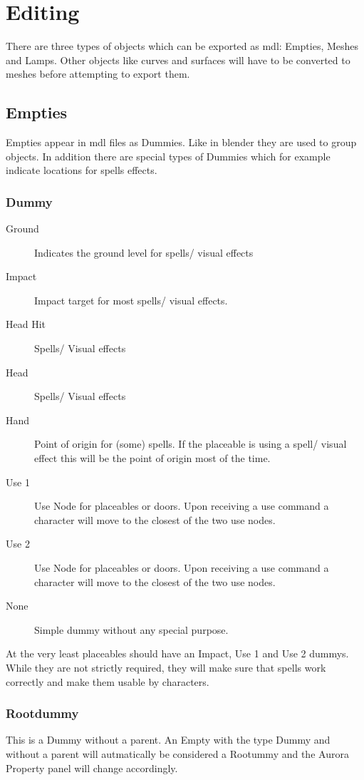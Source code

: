\section{Editing}
There are three types of objects which can be exported as mdl: Empties,
Meshes and Lamps. Other objects like curves and surfaces will have to be
converted to meshes before attempting to export them.

\subsection{Empties}
Empties appear in mdl files as Dummies. Like in blender they are used to group
objects. In addition there are special types of Dummies which for
example indicate locations for spells effects.

\subsubsection{Dummy}

\begin{description}
    \item[Ground] Indicates the ground level for spells/ visual effects
    \item[Impact] Impact target for most spells/ visual effects.
    \item[Head Hit] Spells/ Visual effects
    \item[Head] Spells/ Visual effects
    \item[Hand] Point of origin for (some) spells. If the placeable is using a spell/ visual effect this will be the point of origin most of the time.
    \item[Use 1] Use Node for placeables or doors. Upon receiving a use command a character will move to the closest of the two use nodes.
    \item[Use 2] Use Node for placeables or doors. Upon receiving a use command a character will move to the closest of the two use nodes.
    \item[None] Simple dummy without any special purpose.
\end{description}
At the very least placeables should have an Impact, Use 1 and Use 2 dummys.
While they are not strictly required, they will make sure that spells
work correctly and make them usable by characters.

\subsubsection{Rootdummy}
This is a Dummy without a parent. An Empty with the type Dummy and without
a parent will autmatically be considered a Rootummy and the Aurora Property
panel will change accordingly.

